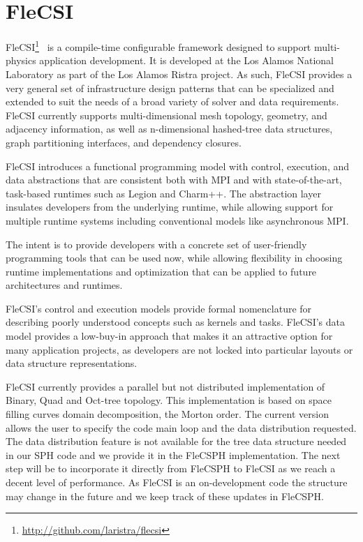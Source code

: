 \section{FleCSI}

FleCSI\footnote{\url{http://github.com/laristra/flecsi}}~\cite{bergen2016flexible} is a compile-time configurable framework designed to support multi-physics application development. 
It is developed at the Los Alamos National Laboratory as part of the Los Alamos Ristra project. 
As such, FleCSI provides a very general set of infrastructure design patterns that can be specialized and extended to suit the needs of a broad variety of solver and data requirements. 
FleCSI currently supports multi-dimensional mesh topology, geometry, and adjacency information, as well as n-dimensional hashed-tree data structures, graph partitioning interfaces, and dependency closures.

FleCSI introduces a functional programming model with control, execution, and data abstractions that are consistent both with MPI and with state-of-the-art, task-based runtimes such as Legion\cite{bauer2012legion} and Charm++\cite{kale1993charm++}. 
The abstraction layer insulates developers from the underlying runtime, while allowing support for multiple runtime systems including conventional models like asynchronous MPI.

The intent is to provide developers with a concrete set of user-friendly programming tools that can be used now, while allowing flexibility in choosing runtime implementations and optimization that can be applied to future architectures and runtimes.

FleCSI's control and execution models provide formal nomenclature for describing poorly understood concepts such as kernels and tasks. 
FleCSI's data model provides a low-buy-in approach that makes it an attractive option for many application projects, as developers are not locked into particular layouts or data structure representations.

FleCSI currently provides a parallel but not distributed implementation of Binary, Quad and Oct-tree topology. 
This implementation is based on space filling curves domain decomposition, the Morton order. 
The current version allows the user to specify the code main loop and the data distribution requested. 
The data distribution feature is not available for the tree data structure needed in our SPH code and we provide it in the FleCSPH implementation. 
The next step will be to incorporate it directly from FleCSPH to FleCSI as we reach a decent level of performance.
As FleCSI is an on-development code the structure may change in the future and we keep track of these updates in FleCSPH.

